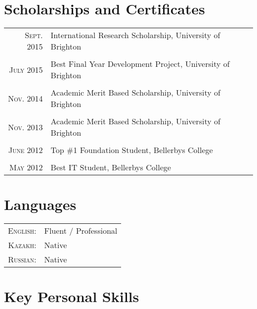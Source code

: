 \documentclass[a4paper,10pt]{article} %
\begin{document}
\section{Scholarships and Certificates}

\begin{tabular}{rl}
\textsc{Sept.} 2015 & International Research Scholarship, University of Brighton \normalsize\\
\\
\textsc{July} 2015 & Best Final Year Development Project, University of Brighton \\
\\
\textsc{Nov.} 2014 & Academic Merit Based Scholarship, University of Brighton \\
\\
\textsc{Nov.} 2013 & Academic Merit Based Scholarship, University of Brighton \\
\\
\textsc{June} 2012 & Top \#1 Foundation Student, Bellerbys College \\
\\
\textsc{May} 2012 & Best IT Student, Bellerbys College \\
\end{tabular}

\pagebreak


\section{Languages}

\begin{tabular}{rl}
\textsc{English:} & Fluent / Professional\\

\textsc{Kazakh:} & Native\\

\textsc{Russian:} & Native\\
\end{tabular}
\bigskip


\section{Key Personal Skills}
\end{document}
